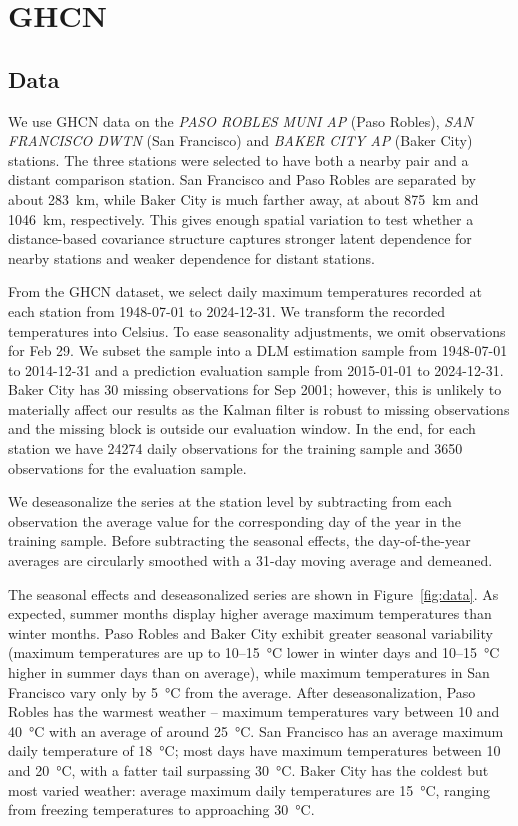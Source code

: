 \documentclass[10pt]{article}
\begin{document}
\clearpage
\pagebreak
\section{GHCN}

\subsection*{Data}

We use GHCN data on the \textit{PASO ROBLES MUNI AP} (Paso Robles), \textit{SAN FRANCISCO DWTN} (San Francisco) and \textit{BAKER CITY AP} (Baker City) stations.
The three stations were selected to have both a nearby pair and a distant comparison station.
San Francisco and Paso Robles are separated by about \SI{283}{km}, while Baker City is much farther away, at about \SI{875}{km} and \SI{1046}{km}, respectively.
This gives enough spatial variation to test whether a distance-based covariance structure captures stronger latent dependence for nearby stations and weaker dependence for distant stations.

From the GHCN dataset, we select daily maximum temperatures recorded at each station from 1948-07-01 to 2024-12-31.
We transform the recorded temperatures into Celsius.
To ease seasonality adjustments, we omit observations for Feb 29.
We subset the sample into a DLM estimation sample from 1948-07-01 to 2014-12-31 and a prediction evaluation sample from 2015-01-01 to 2024-12-31.
Baker City has 30 missing observations for Sep 2001; however, this is unlikely to materially affect our results as the Kalman filter is robust to missing observations and the missing block is outside our evaluation window.
In the end, for each station we have \num{24274} daily observations for the training sample and \num{3650} observations for the evaluation sample.

We deseasonalize the series at the station level by subtracting from each observation the average value for the corresponding day of the year in the training sample.
Before subtracting the seasonal effects, the day-of-the-year averages are circularly smoothed with a 31-day moving average and demeaned.

The seasonal effects and deseasonalized series are shown in Figure~\ref{fig:data}.
As expected, summer months display higher average maximum temperatures than winter months.
Paso Robles and Baker City exhibit greater seasonal variability (maximum temperatures are up to \SI{10}{}--\SI{15}{\celsius} lower in winter days and \SI{10}{}--\SI{15}{\celsius} higher in summer days than on average), while maximum temperatures in San Francisco vary only by \SI{5}{\celsius} from the average.
After deseasonalization, Paso Robles has the warmest weather -- maximum temperatures vary between \SI{10}{} and \SI{40}{\celsius} with an average of around \SI{25}{\celsius}.
San Francisco has an average maximum daily temperature of \SI{18}{\celsius}; most days have maximum temperatures between \SI{10}{} and \SI{20}{\celsius}, with a fatter tail surpassing \SI{30}{\celsius}.
Baker City has the coldest but most varied weather: average maximum daily temperatures are \SI{15}{\celsius}, ranging from freezing temperatures to approaching \SI{30}{\celsius}.
\end{document}
